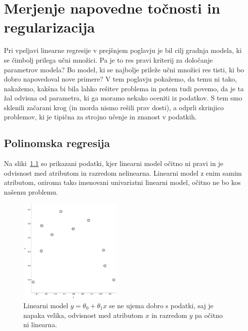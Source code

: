 \chapter{Merjenje napovedne točnosti in regularizacija}

Pri vpeljavi linearne regresije v prejšnjem poglavju je bil cilj
gradnja modela, ki se čimbolj prilega učni množici. Pa je to res pravi
kriterij za določanje parametrov modela? Bo model, ki se najbolje
prileže učni množici res tisti, ki bo dobro napovedoval nove primere?
V tem poglavju pokažemo, da temu ni tako, nakažemo, kakšna bi bila
lahko rešitev problema in potem tudi povemo, da je ta žal odvisna od
parametra, ki ga moramo nekako oceniti iz podatkov. S tem smo sklenili
začarani krog (in morda nismo rešili prav dosti), a odprli skrinjico
problemov, ki je tipična za strojno učenje in znanost v podatkih.

\section{Polinomska regresija}

Na sliki~\ref{fig:poly-linear} so prikazani podatki, kjer linearni model očitno ni pravi in je odvisnost med atributom in razredom nelinearna. Linearni model z enim samim atributom, oziroma tako imenovani univariatni linearni model, očitno ne bo kos našemu problemu. 

\begin{figure}[htbp]
\begin{center}
\includegraphics[width=0.45\textwidth]{slike/poly-linear.png}
\caption{Linearni model $y=\theta_0 + \theta_1 x$ se ne ujema dobro s podatki, saj je napaka velika, odvisnost med atributom $x$ in razredom $y$ pa očitno ni linearna.}
\label{fig:poly-linear}
\end{center}
\end{figure}

